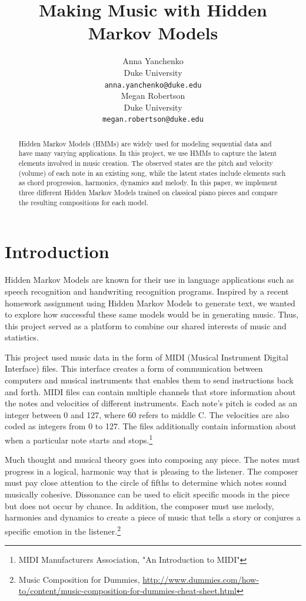 \documentclass{article} %
\title{Making Music with Hidden Markov Models}
\author{
Anna Yanchenko \\
Duke University\\
\texttt{anna.yanchenko@duke.edu} \\
\And
Megan Robertson \\
Duke University \\
\texttt{megan.robertson@duke.edu} \\
}
\begin{document}
\maketitle

\begin{abstract}
Hidden Markov Models (HMMs) are widely used  for modeling sequential data and have many varying applications.  In this project, we use HMMs to capture the latent elements involved in music creation. The observed states are the pitch and velocity (volume) of each note in an existing  song, while the latent states include elements such as chord progression, harmonics, dynamics and melody.  In this paper, we implement three different Hidden Markov Models trained on classical piano pieces and compare the resulting compositions for each model. 
\end{abstract}
 
\section{Introduction}

Hidden Markov Models are known for their use in language applications such as speech recognition and handwriting recognition programs. Inspired by a recent homework assignment using Hidden Markov Models to generate text, we wanted to explore how successful these same models would be in generating music. Thus, this project served as a platform to combine our shared interests of music and statistics. 

This project used music data in the form of MIDI (Musical Instrument Digital Interface) files. This interface creates a form of communication between computers and musical instruments that enables them to send instructions back and forth. MIDI files can contain multiple channels that store information about the notes and velocities of different instruments.   Each note's pitch is coded as an integer between 0 and 127, where 60 refers to middle C.  The velocities are also coded as integers from 0 to 127. The files additionally contain information about when a particular note starts and stops.\footnote{MIDI Manufacturers Association, "An Introduction to MIDI"} 


Much thought and musical theory goes into composing any piece.  The notes must progress in a logical, harmonic way that is pleasing to the listener. The composer must pay close attention to the circle of fifths to determine which notes sound musically cohesive.  Dissonance can be used to elicit specific moods in the piece but does not occur by chance.  In addition, the composer must use melody, harmonies and dynamics to create a piece of music that tells a story or conjures a specific emotion in the listener.\footnote{Music Composition for Dummies, \url{http://www.dummies.com/how-to/content/music-composition-for-dummies-cheat-sheet.html}}
\end{document}
